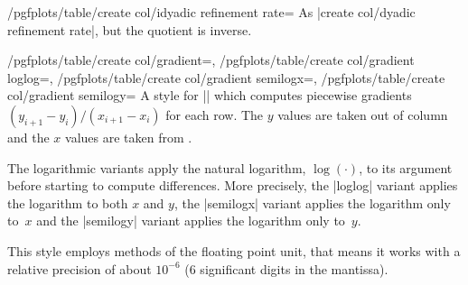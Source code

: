 \documentclass[a4paper]{ltxdoc}
\begin{document}
\begin{stylekey}{/pgfplots/table/create col/idyadic refinement rate=}
    As |create col/dyadic refinement rate|, but the quotient is inverse.
\end{stylekey}

\begin{keylist}{%
    /pgfplots/table/create col/gradient=,
    /pgfplots/table/create col/gradient loglog=,
    /pgfplots/table/create col/gradient semilogx=,
    /pgfplots/table/create col/gradient semilogy=%
}
    A style for |\pgfplotstablecreatecol| which computes piecewise gradients
    $(y_{i+1} - y_i) / (x_{i+1} - x_i )$ for each row. The $y$ values are taken
    out of column  and the $x$ values are taken from .

    The logarithmic variants apply the natural logarithm, $\log(\cdot)$, to its
    argument before starting to compute differences. More precisely, the
    |loglog| variant applies the logarithm to both $x$ and $y$, the |semilogx|
    variant applies the logarithm only to~$x$ and the |semilogy| variant
    applies the logarithm only to~$y$.
\begin{codeexample}[]
\end{codeexample}

\begin{codeexample}[]
\end{codeexample}
    This style employs methods of the floating point unit, that means it works
    with a relative precision of about $10^{-6}$ ($6$ significant digits in the
    mantissa).
\end{keylist}
\end{document}
